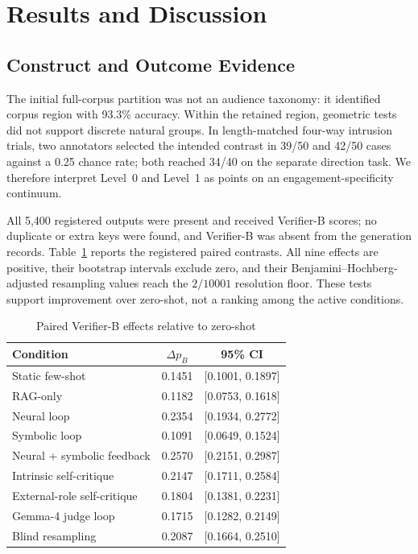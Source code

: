\section{Results and Discussion}
\label{sec:results}

\subsection{Construct and Outcome Evidence}

The initial full-corpus partition was not an audience taxonomy: it identified corpus region with 93.3\% accuracy. Within the retained region, geometric tests did not support discrete natural groups. In length-matched four-way intrusion trials, two annotators selected the intended contrast in 39/50 and 42/50 cases against a 0.25 chance rate; both reached 34/40 on the separate direction task. We therefore interpret Level~0 and Level~1 as points on an engagement-specificity continuum.

All 5,400 registered outputs were present and received Verifier-B scores; no duplicate or extra keys were found, and Verifier-B was absent from the generation records. Table~\ref{tab:paired-results} reports the registered paired contrasts. All nine effects are positive, their bootstrap intervals exclude zero, and their Benjamini--Hochberg-adjusted resampling values reach the $2/10001$ resolution floor. These tests support improvement over zero-shot, not a ranking among the active conditions.

\begin{table}[t]
\centering
\caption{Paired Verifier-B effects relative to zero-shot}
\label{tab:paired-results}
\footnotesize
\setlength{\tabcolsep}{3.0pt}
\renewcommand{\arraystretch}{1.04}
\begin{tabularx}{\columnwidth}{@{}>{\raggedright\arraybackslash}Xcc@{}}
\toprule
\textbf{Condition} & \textbf{$\Delta p_B$} & \textbf{95\% CI} \\
\midrule
Static few-shot & 0.1451 & [0.1001, 0.1897] \\
RAG-only & 0.1182 & [0.0753, 0.1618] \\
Neural loop & 0.2354 & [0.1934, 0.2772] \\
Symbolic loop & 0.1091 & [0.0649, 0.1524] \\
Neural + symbolic feedback & 0.2570 & [0.2151, 0.2987] \\
Intrinsic self-critique & 0.2147 & [0.1711, 0.2584] \\
External-role self-critique & 0.1804 & [0.1381, 0.2231] \\
Gemma-4 judge loop & 0.1715 & [0.1282, 0.2149] \\
Blind resampling & 0.2087 & [0.1664, 0.2510] \\
\bottomrule
\end{tabularx}
\end{table}

